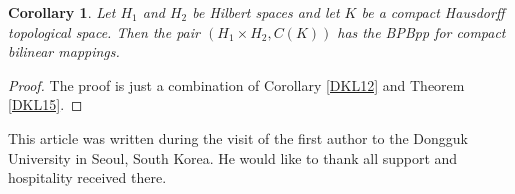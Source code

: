 \documentclass[12pt,a4paper]{amsart}
\newtheorem{corollary}[theorem]{Corollary}
\theoremstyle{definition}
\numberwithin{equation}{section}
\begin{document}
\begin{corollary} Let $H_1$ and $H_2$ be Hilbert spaces and let $K$ be a compact Hausdorff topological space. Then the pair $(H_1 \times H_2, C(K))$ has the BPBpp for compact bilinear mappings.
	\label{DKL16}
\end{corollary}

\begin{proof} 
	The proof is just a combination of Corollary \ref{DKL12} and Theorem \ref{DKL15}.
\end{proof} 




 This article was written during the visit of the first author to the Dongguk University in Seoul, South Korea. He would like to thank all support and hospitality received there.
\end{document}
